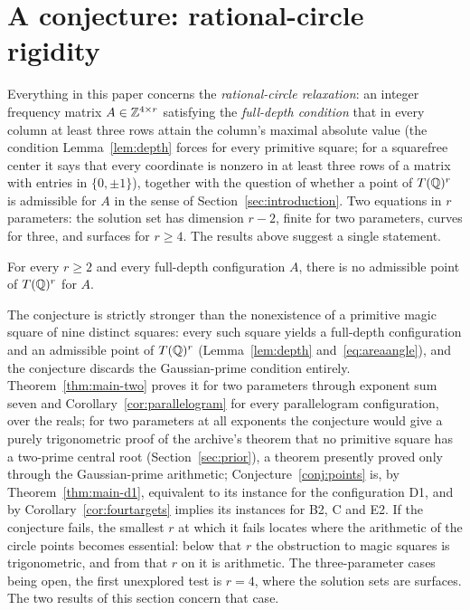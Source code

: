 \section{A conjecture: rational-circle rigidity}\label{sec:rigidity}

Everything in this paper concerns the \emph{rational-circle relaxation}: an integer frequency matrix $A\in\mathbb Z^{4\times r}$
satisfying the \emph{full-depth condition} that in every column at least three rows attain the column's maximal
absolute value (the condition Lemma~\ref{lem:depth} forces for every primitive square; for a squarefree center it says
that every coordinate is nonzero in at least three rows of a matrix with entries in $\{0,\pm1\}$), together with the
question of whether a point of $T(\mathbb Q)^r$ is admissible for $A$ in the sense of Section~\ref{sec:introduction}. Two equations in $r$ parameters: the solution set has
dimension $r-2$, finite for two parameters, curves for three, and surfaces for $r\ge4$. The results above suggest a
single statement.

\begin{conjecture}\label{conj:rigidity}
For every $r\ge2$ and every full-depth configuration $A$, there is no admissible point of $T(\mathbb Q)^r$ for $A$.
\end{conjecture}

The conjecture is strictly stronger than the nonexistence of a primitive magic square of nine distinct squares: every
such square yields a full-depth configuration and an admissible point of $T(\mathbb Q)^r$ (Lemma~\ref{lem:depth} and~\eqref{eq:areaangle}),
and the conjecture discards the Gaussian-prime condition entirely. Theorem~\ref{thm:main-two} proves it for two parameters
through exponent sum seven and Corollary~\ref{cor:parallelogram} for every parallelogram configuration, over the reals; for two parameters at all exponents the conjecture would give a purely trigonometric proof of the archive's theorem
that no primitive square has a two-prime central root (Section~\ref{sec:prior}), a theorem presently proved only through the
Gaussian-prime arithmetic;
Conjecture~\ref{conj:points} is, by Theorem~\ref{thm:main-d1}, equivalent to its instance for the configuration D1, and by
Corollary~\ref{cor:fourtargets} implies its instances for B2, C and E2. If the conjecture fails, the smallest $r$ at which it
fails locates where the arithmetic of the circle points becomes essential: below that $r$ the obstruction to magic squares
is trigonometric, and from that $r$ on it is arithmetic. The three-parameter cases being open, the first unexplored test is
$r=4$, where the solution sets are surfaces. The two results of this section concern that case.

